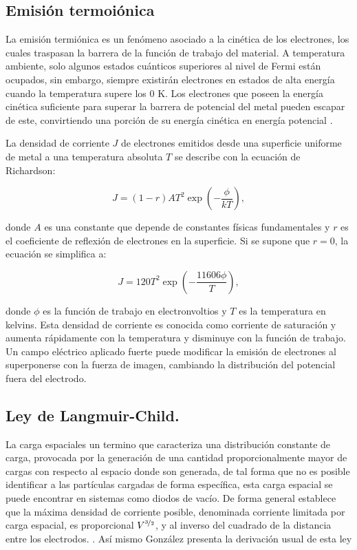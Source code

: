 \subsection{Emisión termoiónica}

La emisión termiónica es un fenómeno asociado a la cinética de los electrones, los cuales traspasan la barrera de la función de trabajo del material. A temperatura ambiente, solo algunos estados cuánticos superiores al nivel de Fermi están ocupados, sin embargo, siempre existirán electrones en estados de alta energía cuando la temperatura supere los 0 K. Los electrones que poseen la energía cinética suficiente para superar la barrera de potencial del metal pueden escapar de este, convirtiendo una porción de su energía cinética en energía potencial \cite{huffman}.

La densidad de corriente \( J \) de electrones emitidos desde una superficie uniforme de metal a una temperatura absoluta \( T \) se describe con la ecuación de Richardson:

\begin{equation}
	J = (1 - r) A T^2 \exp\left(-\frac{\phi}{kT}\right),
\end{equation}

donde \( A \) es una constante que depende de constantes físicas fundamentales y \( r \) es el coeficiente de reflexión de electrones en la superficie. Si se supone que \( r = 0 \), la ecuación se simplifica a:

\begin{equation}
J = 120 T^2 \exp\left(-\frac{11606 \phi}{T}\right),
\end{equation}


donde \( \phi \) es la función de trabajo en electronvoltios y \( T \) es la temperatura en kelvins. Esta densidad de corriente es conocida como corriente de saturación y aumenta rápidamente con la temperatura y disminuye con la función de trabajo. Un campo eléctrico aplicado fuerte puede modificar la emisión de electrones al superponerse con la fuerza de imagen, cambiando la distribución del potencial fuera del electrodo.

\subsection{Ley de Langmuir-Child.}

La carga espaciales un termino que caracteriza una distribución constante de carga, provocada por la generación de una cantidad proporcionalmente mayor de cargas con respecto al espacio donde son generada, de tal forma que no es posible identificar a las  partículas cargadas de forma específica, esta carga espacial se puede encontrar en sistemas como diodos de vacío. De forma general establece que la máxima densidad de corriente posible, denominada corriente limitada por carga espacial, es proporcional $V^{\nicefrac{3}{2}}$, y al inverso del cuadrado de la distancia entre los electrodos. \cite{lau, gonzalez}. Así mismo González \cite{gonzalez} presenta la derivación usual de esta ley 


